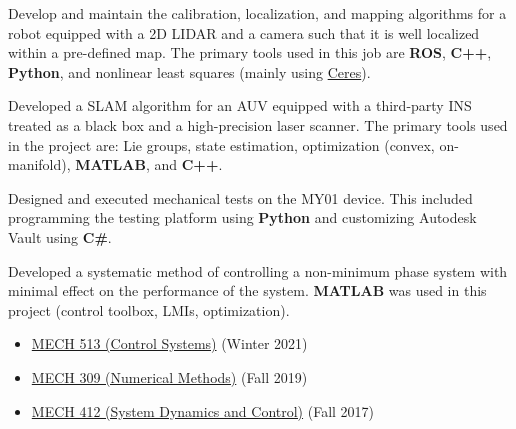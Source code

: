 \documentclass[10pt,letter]{altacv}
\begin{document}
Develop and maintain the calibration, localization, and mapping algorithms for a robot equipped with a 2D LIDAR and a camera such that it is well localized within a pre-defined map.
The primary tools used in this job are \textbf{ROS}, \textbf{C++}, \textbf{Python}, and nonlinear least squares (mainly using \href{https://github.com/ceres-solver/ceres-solver}{Ceres}).

\divider

Developed a SLAM algorithm for an AUV equipped with a third-party INS treated as a black box and a high-precision laser scanner.
The primary tools used in the project are:
Lie groups, state estimation, optimization (convex, on-manifold), \textbf{MATLAB}, and \textbf{C++}.

\divider

Designed and executed mechanical tests on the MY01 device.
This included programming the testing platform using \textbf{Python} and customizing Autodesk Vault using \textbf{C\#}.

\divider

Developed a systematic method of controlling a non-minimum phase system with minimal
effect on the performance of the system.
\textbf{MATLAB} was used in this project (control toolbox, LMIs, optimization).

\divider

\begin{itemize}[noitemsep]
  \item \href{https://www.mcgill.ca/study/2022-2023/courses/mech-513}{MECH 513 (Control Systems)} (Winter 2021)
  \item \href{https://www.mcgill.ca/study/2022-2023/courses/mech-309}{MECH 309 (Numerical Methods)} (Fall 2019)
  \item \href{https://www.mcgill.ca/study/2022-2023/courses/mech-412}{MECH 412 (System Dynamics and Control)} (Fall 2017)
\end{itemize}
\end{document}

